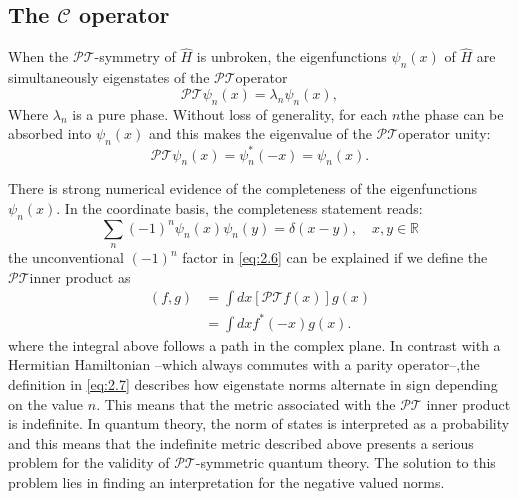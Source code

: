 \documentclass[12pt, a4paper]{report}
\newcommand\PT{\(\mathcal{PT}\)}
\begin{document}
\subsection{The $\mathcal{C}$ operator}\label{CC}
When the \PT-symmetry of $\hat{H}$ is unbroken, the eigenfunctions $\psi_n(x)$ of $\hat{H}$ are simultaneously eigenstates of the \PT\:operator\cite{Bender_2004}
\begin{equation}\label{eq:2.4}
\mathcal{PT}\psi_n(x) = \lambda_n \psi_n(x),
\end{equation}
Where $\lambda_n$ is a pure phase. Without loss of generality, for each $n$\:the phase can be absorbed into $\psi_n(x)$ and this makes the eigenvalue of the \PT operator unity\cite{Bender_2004}: 
\begin{equation}\label{eq:2.5}
\mathcal{PT}\psi_n(x) = \psi_{n}^{*}(-x) = \psi_n(x).
\end{equation}

There is strong numerical evidence of the completeness of the eigenfunctions $\psi_n(x)$\cite{ComplexExtension, Bender_2004}\cite{Brody_2013}. In the coordinate basis, the completeness statement reads:
\begin{equation}\label{eq:2.6}
\sum_{n}(-1)^{n}\psi_n(x)\psi_n(y) = \delta(x-y),\quad x, y \in \mathbb{R}
\end{equation}
the unconventional $(-1)^n$ factor in \ref{eq:2.6} can be explained if we define the \PT\:inner product as
\begin{align}\label{eq:2.7}
\left ( f, g \right )  & = \int dx \left [ \mathcal{PT} f(x) \right ] g(x)\nonumber\\
                       & = \int dx f^{*}(-x) g(x).
\end{align}
where the integral above follows a path in the complex plane. In contrast with a Hermitian Hamiltonian --which always commutes with a parity operator--,the definition in \ref{eq:2.7} describes how eigenstate norms alternate in sign depending on the value $n$. 
This means that the metric associated with the \PT\: inner product is indefinite\cite{Bender_2004,Critique}.
In quantum theory, the norm of states is interpreted as a probability and this means that the indefinite metric described above presents a serious problem for the validity of \PT-symmetric quantum theory. The solution to this problem lies in finding an interpretation for the negative valued norms\cite{PTsymmetricQM}.
\end{document}
